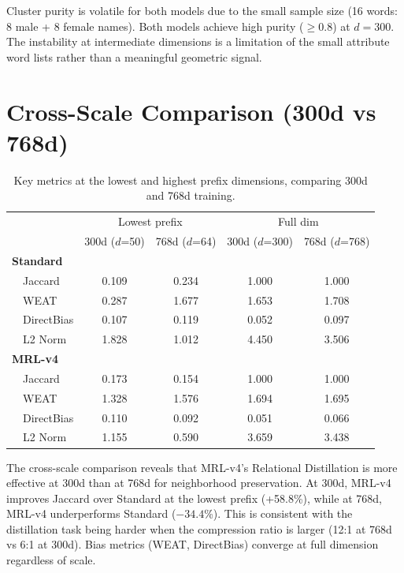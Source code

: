 \documentclass[11pt,a4paper]{article}
\begin{document}
Cluster purity is volatile for both models due to the small sample size (16 words: 8 male + 8 female names). Both models achieve high purity ($\geq 0.8$) at $d=300$. The instability at intermediate dimensions is a limitation of the small attribute word lists rather than a meaningful geometric signal.

\section{Cross-Scale Comparison (300d vs 768d)}

\begin{table}[H]
\centering
\caption{Key metrics at the lowest and highest prefix dimensions, comparing 300d and 768d training.}
\small
\begin{tabular}{lcccc}
\toprule
 & \multicolumn{2}{c}{Lowest prefix} & \multicolumn{2}{c}{Full dim} \\
 & 300d ($d$=50) & 768d ($d$=64) & 300d ($d$=300) & 768d ($d$=768) \\
\midrule
\textbf{Standard} & & & & \\
~~Jaccard       & 0.109 & 0.234 & 1.000 & 1.000 \\
~~WEAT          & 0.287 & 1.677 & 1.653 & 1.708 \\
~~DirectBias    & 0.107 & 0.119 & 0.052 & 0.097 \\
~~L2 Norm       & 1.828 & 1.012 & 4.450 & 3.506 \\
\midrule
\textbf{MRL-v4} & & & & \\
~~Jaccard       & 0.173 & 0.154 & 1.000 & 1.000 \\
~~WEAT          & 1.328 & 1.576 & 1.694 & 1.695 \\
~~DirectBias    & 0.110 & 0.092 & 0.051 & 0.066 \\
~~L2 Norm       & 1.155 & 0.590 & 3.659 & 3.438 \\
\bottomrule
\end{tabular}
\label{tab:cross}
\end{table}

The cross-scale comparison reveals that MRL-v4's Relational Distillation is more effective at 300d than at 768d for neighborhood preservation. At 300d, MRL-v4 improves Jaccard over Standard at the lowest prefix (+58.8\%), while at 768d, MRL-v4 underperforms Standard ($-34.4$\%). This is consistent with the distillation task being harder when the compression ratio is larger (12:1 at 768d vs 6:1 at 300d). Bias metrics (WEAT, DirectBias) converge at full dimension regardless of scale.
\end{document}
